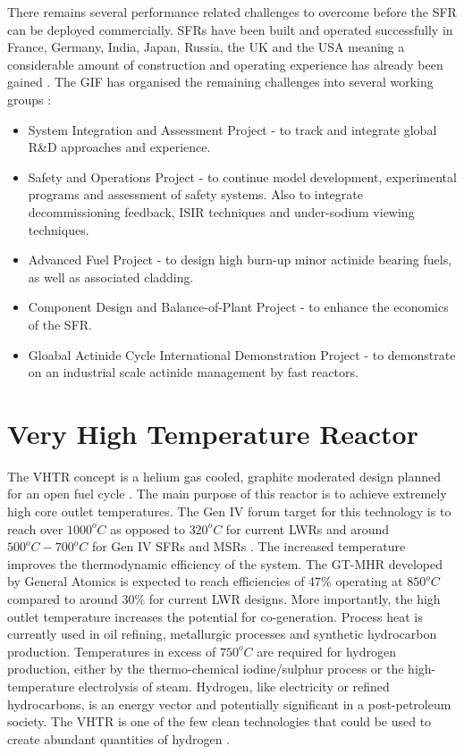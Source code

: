 \documentclass[journal]{IEEEtran}
\begin{document}
There remains several performance related challenges to overcome before the SFR can be deployed commercially. 
SFRs have been built and operated successfully in France, Germany, India, Japan, Russia, the UK and the USA meaning a considerable amount of construction and operating experience has already been gained \cite{Int2012}.
The GIF has organised the remaining challenges into several working groups \cite{GenIVForum}:
\begin{itemize}
\item System Integration and Assessment Project - to track and integrate global R\&D approaches and experience.
\item Safety and Operations Project - to continue model development, experimental programs and assessment of safety systems. Also to integrate decommissioning feedback, ISIR techniques and under-sodium viewing techniques.
\item Advanced Fuel Project - to design high burn-up minor actinide bearing fuels, as well as associated cladding.%
\item Component Design and Balance-of-Plant Project - to enhance the economics of the SFR.%
\item Gloabal Actinide Cycle International Demonstration Project - to demonstrate on an industrial scale actinide management by fast reactors.
\end{itemize}



\section{Very High Temperature Reactor}
The VHTR concept is a helium gas cooled, graphite moderated design planned for an open fuel cycle \cite{Marques2010a}.
The main purpose of this reactor is to achieve extremely high core outlet temperatures. The Gen IV forum target for this technology is to reach over $1000^oC$ \cite{GenIVRoadmap} as opposed to $320^oC$ for current LWRs and around $500^oC-700^oC$ for Gen IV SFRs and MSRs \cite{Bhatnagar2011}.
The increased temperature improves the thermodynamic efficiency of the system.
The GT-MHR developed by General Atomics is expected to reach efficiencies of 47\% operating at $850^oC$ \cite{Marques2010a} compared to around 30\% for current LWR designs.
More importantly, the high outlet temperature increases the potential for co-generation.
Process heat is currently used in oil refining, metallurgic processes and synthetic hydrocarbon production.
Temperatures in excess of $750^oC$ are required for hydrogen production, either by the thermo-chemical iodine/sulphur process or the high-temperature electrolysis of steam.
Hydrogen, like electricity or refined hydrocarbons, is an energy vector and potentially significant in a post-petroleum society.
The VHTR is one of the few clean technologies that could be used to create abundant quantities of hydrogen \cite{Bhatnagar2011}.
\end{document}
